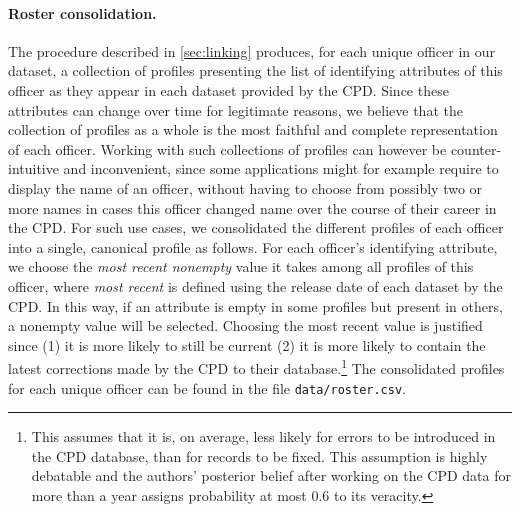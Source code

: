 \paragraph{Roster consolidation.}
The procedure described in \cref{sec:linking} produces, for each unique officer
in our dataset, a collection of profiles presenting the list of identifying
attributes of this officer as they appear in each dataset provided by the CPD.
Since these attributes can change over time for legitimate reasons, we believe
that the collection of profiles as a whole is the most faithful and complete
representation of each officer. Working with such collections of profiles can
however be counter-intuitive and inconvenient, since some applications might
for example require to display the name of an officer, without having to choose
from possibly two or more names in cases this officer changed name over the
course of their career in the CPD. For such use cases, we consolidated the
different profiles of each officer into a single, canonical profile as follows.
For each officer's identifying attribute, we choose the \emph{most recent
nonempty} value it takes among all profiles of this officer, where \emph{most
recent} is defined using the release date of each dataset by the CPD. In this way,
if an attribute is empty in some profiles but present in others, a nonempty value
will be selected. Choosing the most recent value is justified since (1) it is
more likely to still be current (2) it is more likely to contain the latest
corrections made by the CPD to their database.\footnote{This assumes that it
is, on average, less likely for errors to be introduced in the CPD database,
than for records to be fixed. This assumption is highly debatable and the
authors' posterior belief after working on the CPD data for more than a year
assigns probability at most $0.6$ to its veracity.} The consolidated profiles
for each unique officer can be found in the file \texttt{data/roster.csv}.


